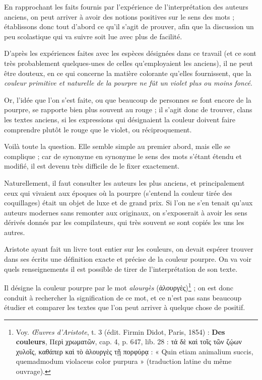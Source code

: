 \documentclass[a4paper, 11pt, oneside, polutonikogreek, french]{article}
\begin{document}
En rapprochant les faits fournis par l'expérience de l'interprétation des auteurs anciens, on peut arriver à avoir des notions positives sur le sens des mots ; établissons donc tout d'abord ce qu'il s'agit de prouver, afin que la discussion un peu scolastique qui va suivre soit lue avec plus de facilité.

D'après les expériences faites avec les espèces désignées dans ce travail (et ce sont très probablement quelques-unes de celles qu'employaient les anciens), il ne peut être douteux, en ce qui concerne la matière colorante qu'elles fournissent, que la \emph{couleur primitive et naturelle de la pourpre ne fût un violet plus ou moins foncé}.

Or, l'idée que l'on s'est faite, ou que beaucoup de personnes se font encore de la pourpre, se rapporte bien plus souvent au rouge ; il s'agit donc de trouver, clans les textes anciens, si les expressions qui désignaient la couleur doivent faire comprendre plutôt le rouge que le violet, ou réciproquement.

Voilà toute la question. Elle semble simple au premier abord, mais elle se complique ; car de synonyme en synonyme le sens des mots s'étant étendu et modifié, il est devenu très difficile de le fixer exactement.

Naturellement, il faut consulter les auteurs les plus anciens, et principalement ceux qui vivaient aux époques où la pourpre (s'entend la couleur tirée des coquillages) était un objet de luxe et de grand prix. Si l'on ne s'en tenait qu'aux auteurs modernes sans remonter aux originaux, on s'exposerait à avoir les sens dérivés donnés par les compilateurs, qui très souvent se sont copiés les uns les autres.

Aristote ayant fait un livre tout entier sur les couleurs, on devait espérer trouver dans ses écrits une définition exacte et précise de la couleur pourpre. On va voir quels renseignements il est possible de tirer de l'interprétation de son texte.

Il désigne la couleur pourpre par le mot \emph{alourgès} (ἁλουργὲς)\footnote{Voy. \emph{Œuvres d'Aristote}, t. 3 (édit. Firmin Didot, Paris, 1854) : \textbf{Des couleurs}, Περὶ χρωματῶν, cap. 4, p. 647, lib. 28 : τά δὲ καὶ τοῖς τῶν ζῴων χυλοῖς, καθάπερ καὶ τὸ ἁλουργὲς τῇ πορφύρᾳ : « Quin etiam animalium succis, quemadmodum violaceus color purpura » (traduction latine du même ouvrage).} ; on est donc conduit à rechercher la signification de ce mot, et ce n'est pas sans beaucoup étudier et comparer les textes que l'on peut arriver à quelque chose de positif.
\end{document}
